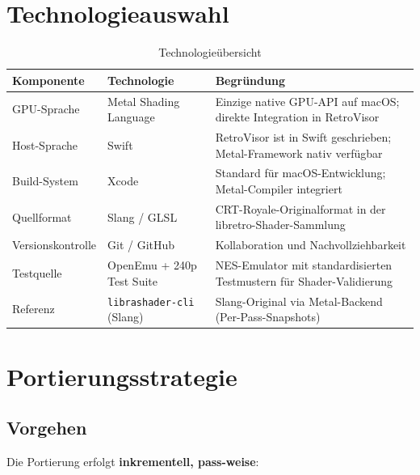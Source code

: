 \documentclass[11pt, a4paper]{article}
\newcommand{\tableheadercolor}{\rowcolor{hkared}}
\newcommand{\thw}[1]{\color{white}\textbf{#1}}  %
\begin{document}
\section{Technologieauswahl} \vspace{-.125cm}
\begin{table}[H]
\centering
\small
{}
\begin{tabularx}{\textwidth}{llX}
    \toprule
    \tableheadercolor \thw{Komponente} & \thw{Technologie} & \thw{Begr\"undung} \\
    \midrule
    GPU-Sprache & Metal Shading Language & Einzige native GPU-API auf macOS; \newline direkte Integration in RetroVisor \\
    Host-Sprache & Swift & RetroVisor ist in Swift geschrieben; \newline Metal-Framework nativ verf\"ugbar \\
    Build-System & Xcode & Standard f\"ur macOS-Entwicklung; \newline Metal-Compiler integriert \\
    Quellformat & Slang / GLSL & CRT-Royale-Originalformat in der \newline libretro-Shader-Sammlung \\
    Versionskontrolle & Git / GitHub & Kollaboration und Nachvollziehbarkeit \\
    Testquelle & OpenEmu + 240p Test Suite & NES-Emulator mit standardisierten \newline Testmustern f\"ur Shader-Validierung \\
    Referenz & \texttt{librashader-cli} (Slang) & Slang-Original via Metal-Backend (Per-Pass-Snapshots) \\
    \bottomrule
\end{tabularx}
\caption{Technologie\"ubersicht}
\end{table}
\vspace{-.5cm}
\section{Portierungsstrategie}
\vspace{.125cm}

\subsection{Vorgehen}
\vspace{.25cm}
Die Portierung erfolgt \textbf{inkrementell, pass-weise}: \vspace{.25cm}
\end{document}
